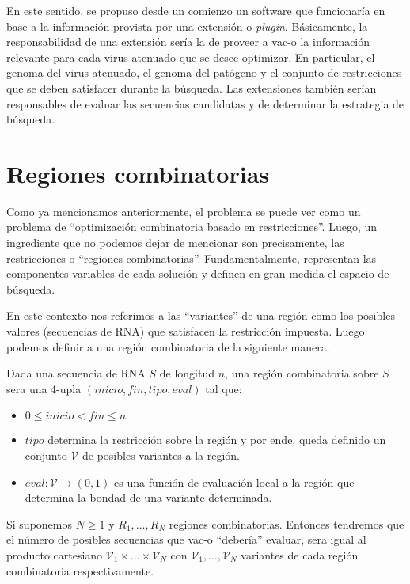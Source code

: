 En este sentido, se propuso desde un comienzo un software que funcionar\'ia en
base a la informaci\'on provista por una extensi\'on o \textit{plugin}.
B\'asicamente, la responsabilidad de una extensi\'on ser\'ia la de proveer a
\ac{vac-o} la informaci\'on relevante para cada virus atenuado que se desee
optimizar. En particular, el genoma del virus atenuado, el genoma del
pat\'ogeno y el conjunto de restricciones que se deben satisfacer durante la
b\'usqueda. Las extensiones tambi\'en ser\'ian responsables de evaluar las
secuencias candidatas y de determinar la estrategia de b\'usqueda.


\section{Regiones combinatorias}

Como ya mencionamos anteriormente, el problema se puede ver como un problema de
``optimizaci\'on combinatoria basado en restricciones''. Luego, un ingrediente
que no podemos dejar de mencionar son precisamente, las restricciones o
``regiones combinatorias''. Fundamentalmente, representan las componentes
variables de cada soluci\'on y definen en gran medida el espacio de b\'usqueda.

En este contexto nos referimos a las ``variantes'' de una regi\'on como los
posibles valores (secuencias de \ac{RNA}) que satisfacen la restricci\'on
impuesta. Luego podemos definir a una regi\'on combinatoria de la siguiente
manera.
\begin{definition}
\label{region}
Dada una secuencia de \ac{RNA} $S$ de longitud $n$, una regi\'on combinatoria
sobre $S$ sera una 4-upla $(inicio, fin, tipo, eval)$ tal que:
\begin{itemize}
 \item $0 \le inicio < fin \le n$
 \item $tipo$ determina la restricci\'on sobre la regi\'on y por ende, queda
definido un conjunto $\mathcal{V}$ de posibles variantes a la regi\'on.
 \item $eval: \mathcal{V} \rightarrow (0,1)$ es una funci\'on de evaluaci\'on
local a la regi\'on que determina la bondad de una variante determinada.
\end{itemize}
\end{definition}

Si suponemos $N \ge 1$ y $R_{1}, \dots, R_{N}$ regiones combinatorias.
Entonces tendremos que el n\'umero de posibles secuencias que \ac{vac-o}
``deber\'ia'' evaluar, sera igual al producto cartesiano $\mathcal{V}_{1} \times
\dots \times \mathcal{V}_{N}$ con  $\mathcal{V}_{1}, \dots, \mathcal{V}_{N}$
variantes de cada regi\'on combinatoria respectivamente.

